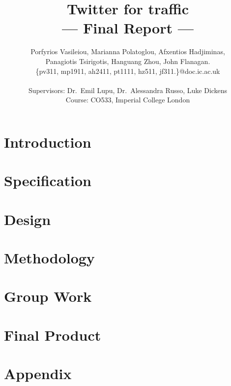 \documentclass[a4paper,11pt]{article}
\title{Twitter for traffic\\\Large{--- Final Report ---}}
\author{Porfyrios Vasileiou, Marianna Polatoglou, Afxentios Hadjiminas,\\
        Panagiotis Tsirigotis, Hanguang Zhou, John Flanagan.\\
       \{pv311, mp1911, ah2411, pt1111, hz511, jf311.\}@doc.ic.ac.uk\\ \\
       \small{Supervisors: Dr.\ Emil Lupu, Dr.\ Alessandra Russo, Luke Dickens}\\
       \small{Course: CO533, Imperial College London}
}
\begin{document}
\maketitle

\section{Introduction}
	

\section{Specification}
	

\section{Design}
	

\section{Methodology}
	

\section{Group Work}
	
	
\section{Final Product}
	

\pagebreak

\section{Appendix}
	

%	
%	
\end{document}

